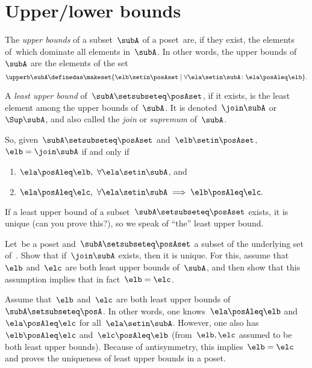 \section{Upper/lower bounds}
\begin{ctdefinition}
    \label{def:least-upper-bound}
    The \emph{upper bounds} of a subset~$\subA$ of a poset~\posA are, if they exist, the elements of~\posA which dominate all elements in~$\subA$.
    In other words, the upper bounds of~$\subA$ are the elements of the set
    \begin{equation}
        \upperb \subA\definedas \makeset{ \elb \setin \posAset \mid \forall \ela \setin \subA  \colon \ela \posAleq \elb }.
    \end{equation}
\end{ctdefinition}

\begin{ctdefinition}
    A \emph{least upper bound} of~$\subA \setsubseteq \posAset$, if it exists, is the least element among the upper bounds of~$\subA$.
    It is denoted~$\join \subA$ or~$\Sup\subA$, and also called the \emph{join} or \emph{supremum} of~$\subA$.
\end{ctdefinition}

So, given~$\subA \setsubseteq \posAset$ and~$\elb \setin \posAset$,~$\elb =  \join \subA$ if and only if
\begin{enumerate}
    \item $\ela \posAleq \elb, \ \forall \ela \setin \subA$, and
    \item $\ela \posAleq \elc, \ \forall \ela \setin \subA \implies \elb \posAleq \elc.
          $
\end{enumerate}

If a least upper bound of a subset~$\subA \setsubseteq \posAset$ exists, it is unique (can you prove this?), so we speak of ``the'' least upper bound.

\begin{exercise}
    Let~\posA be a poset and~$\subA \setsubseteq \posAset$ a subset of the underlying set of~\posA.
    Show that if~$\join \subA$ exists, then it is unique.
    For this, assume that~$\elb$ and~$\elc$ are both least upper bounds of~$\subA$, and then show that this assumption implies that in fact~$\elb = \elc$.
\end{exercise}
\begin{solution}
    Assume that~$\elb$ and~$\elc$ are both least upper bounds of~$\subA \setsubseteq \posA$.
    In other words, one knows~$\ela \posAleq \elb$ and~$\ela\posAleq \elc$ for all~$\ela\setin \subA$.
    However, one also has~$\elb\posAleq \elc$ and~$\elc\posAleq \elb$ (from~$\elb,\elc$ assumed to be both least upper bounds).
    Because of antisymmetry, this implies~$\elb=\elc$ and proves the uniqueness of least upper bounds in a poset.
\end{solution}

